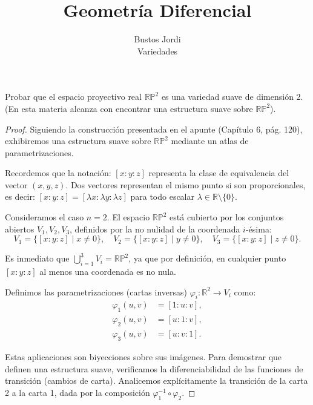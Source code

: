 \documentclass{article}
\newcommand{\RP}{\mathbb{R}\mathbb{P}}
\newenvironment{theorem}[2][Ejercicio]{\begin{trivlist}
\item[\hskip \labelsep {\bfseries #1}\hskip \labelsep {\bfseries #2.}]}{\end{trivlist}}
\begin{document}
\title{Geometría Diferencial}
\author{Bustos Jordi\\Variedades}

\maketitle

\begin{theorem}{1}
    Probar que el espacio proyectivo real \( \RP^2 \) es una variedad suave de dimensión 2. (En esta materia alcanza con encontrar una estructura suave sobre \( \RP^2 \)).
\end{theorem}

\begin{proof}
    Siguiendo la construcción presentada en el apunte (Capítulo 6, pág. 120), exhibiremos una estructura suave sobre \( \RP^2 \) mediante un atlas de parametrizaciones.

    Recordemos que la notación: \( [x : y : z] \)
    representa la clase de equivalencia del vector \( (x, y, z) \). Dos vectores representan el mismo punto si son proporcionales, es decir: \( [x : y : z] = [\lambda x : \lambda y : \lambda z] \)
    para todo escalar \(\lambda \in \mathbb{R} \setminus \{0\} \).

    Consideramos el caso \( n=2 \). El espacio \(\RP^2\) está cubierto por los conjuntos abiertos \(V_1, V_2, V_3\), definidos por la no nulidad de la coordenada \(i\)-ésima:
    \[ V_1 = \{[x:y:z] \mid x \neq 0\}, \quad V_2 = \{[x:y:z] \mid y \neq 0\}, \quad V_3 = \{[x:y:z] \mid z \neq 0\}. \]

    Es inmediato que \(\bigcup_{i=1}^3 V_i = \RP^2\), ya que por definición, en cualquier punto \([x:y:z]\) al menos una coordenada es no nula.

    Definimos las parametrizaciones (cartas inversas) \(\varphi_i : \mathbb{R}^2 \to V_i\) como:
    \begin{align*}
        \varphi_1(u,v) & = [1 : u : v], \\
        \varphi_2(u,v) & = [u : 1 : v], \\
        \varphi_3(u,v) & = [u : v : 1].
    \end{align*}

    Estas aplicaciones son biyecciones sobre sus imágenes. Para demostrar que definen una estructura suave, verificamos la diferenciabilidad de las funciones de transición (cambios de carta). Analicemos explícitamente la transición de la carta 2 a la carta 1, dada por la composición \(\varphi_1^{-1} \circ \varphi_2\).


\end{proof}
\end{document}
